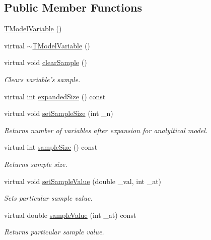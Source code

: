 \subsection*{Public Member Functions}
\begin{DoxyCompactItemize}
\item 
\hyperlink{class_go_s_u_m_1_1_t_model_variable_af0df5acf6df0b5a277529ec8f6e080d7}{T\-Model\-Variable} ()
\item 
virtual \hyperlink{class_go_s_u_m_1_1_t_model_variable_afd83a567b87fa34ca212ec216ee7b5cd}{$\sim$\-T\-Model\-Variable} ()
\item 
virtual void \hyperlink{class_go_s_u_m_1_1_t_model_variable_a92694058f7f782f6e7302f1130f1f174}{clear\-Sample} ()
\begin{DoxyCompactList}\small\item\em Clears variable's sample. \end{DoxyCompactList}\item 
virtual int \hyperlink{class_go_s_u_m_1_1_t_model_variable_ae00e5653833fcf6f8d05c24d4cff741d}{expanded\-Size} () const 
\item 
virtual void \hyperlink{class_go_s_u_m_1_1_t_model_variable_aa172b11eba6fd1819f10a80d95fc4877}{set\-Sample\-Size} (int \-\_\-n)
\begin{DoxyCompactList}\small\item\em Returns number of variables after expansion for analyitical model. \end{DoxyCompactList}\item 
virtual int \hyperlink{class_go_s_u_m_1_1_t_model_variable_a4c63e42e4ec1971dc9d5671785071426}{sample\-Size} () const 
\begin{DoxyCompactList}\small\item\em Returns sample size. \end{DoxyCompactList}\item 
virtual void \hyperlink{class_go_s_u_m_1_1_t_model_variable_acc9cdd0db3d7bc217ae68da7bd6de737}{set\-Sample\-Value} (double \-\_\-val, int \-\_\-at)
\begin{DoxyCompactList}\small\item\em Sets particular sample value. \end{DoxyCompactList}\item 
virtual double \hyperlink{class_go_s_u_m_1_1_t_model_variable_ae851745a4f6ec2f6655adcbbc83ff8c5}{sample\-Value} (int \-\_\-at) const 
\begin{DoxyCompactList}\small\item\em Returns particular sample value. \end{DoxyCompactList}\item 

\end{DoxyCompactItemize}
